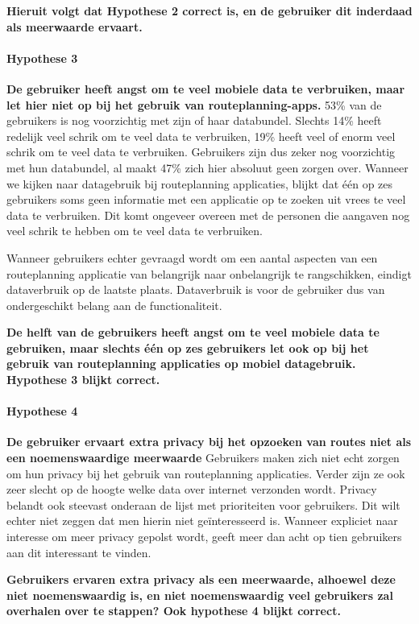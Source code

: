 	\textbf{Hieruit volgt dat Hypothese 2 correct is, en de gebruiker dit inderdaad als meerwaarde ervaart. }	
\paragraph{Hypothese 3}\textbf{ De gebruiker heeft angst om te veel mobiele data te verbruiken, maar let hier niet op bij het gebruik van routeplanning-apps.}
    53\% van de gebruikers is nog voorzichtig met zijn of haar databundel. Slechts 14\% heeft redelijk veel schrik om te veel data te verbruiken, 19\% heeft veel of enorm veel schrik om te veel data te verbruiken. Gebruikers zijn dus zeker nog voorzichtig met hun databundel, al maakt 47\% zich hier absoluut geen zorgen over.
    Wanneer we kijken naar datagebruik bij routeplanning applicaties, blijkt dat één op zes gebruikers soms geen informatie met een applicatie op te zoeken uit vrees te veel data te verbruiken. Dit komt ongeveer overeen met de personen die aangaven nog veel schrik te hebben om te veel data te verbruiken.
    
    Wanneer gebruikers echter gevraagd wordt om een aantal aspecten van een routeplanning applicatie van belangrijk naar onbelangrijk te rangschikken, eindigt dataverbruik op de laatste plaats. Dataverbruik is voor de gebruiker dus van ondergeschikt belang aan de functionaliteit.
    
    \textbf{De helft van de gebruikers heeft angst om te veel mobiele data te gebruiken, maar slechts één op zes gebruikers let ook op bij het gebruik van routeplanning applicaties op mobiel datagebruik. Hypothese 3 blijkt correct.}
\paragraph{Hypothese 4}\textbf{De gebruiker ervaart extra privacy bij het opzoeken van routes niet als een noemenswaardige meerwaarde}
	Gebruikers maken zich niet echt zorgen om hun privacy bij het gebruik van routeplanning applicaties. Verder zijn ze ook zeer slecht op de hoogte welke data over internet verzonden wordt. Privacy belandt ook steevast onderaan de lijst met prioriteiten voor gebruikers. Dit wilt echter niet zeggen dat men hierin niet geïnteresseerd is. Wanneer expliciet naar interesse om meer privacy gepolst wordt, geeft meer dan acht op tien gebruikers aan dit interessant te vinden.
	
	\textbf{Gebruikers ervaren extra privacy als een meerwaarde, alhoewel deze niet noemenswaardig is, en niet noemenswaardig veel gebruikers zal overhalen over te stappen? Ook hypothese 4 blijkt correct.}